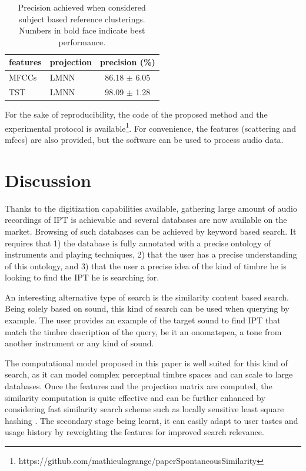 \documentclass{article}
\newcommand{\ipt}{IPT\xspace}
\begin{document}
\begin{table}
  \caption{Precision achieved when considered subject based reference clusterings. Numbers in bold face indicate best performance.}
  \label{tab:res2}
  \begin{center}
\begin{tabular}{llc}
features & projection & precision (\%) \\
  \hline
MFCCs & LMNN & 86.18 $\pm$ 6.05 \\
TST & LMNN & 98.09 $\pm$ 1.28 \\
\end{tabular}
\end{center}
\end{table}


For the sake of reproducibility, the code of the proposed method and the experimental protocol is available\footnote{https://github.com/mathieulagrange/paperSpontaneousSimilarity}. For convenience, the features (scattering and mfccs) are also provided, but the software can be used to process audio data.

\section{Discussion}\label{sec:discussion}

Thanks to the digitization capabilities available, gathering large amount of audio recordings of \ipt is achievable and several databases are now available on the market. Browsing of such databases can be achieved by keyword based search. It requires that 1) the database is fully annotated with a precise ontology of instruments and playing techniques, 2) that the user has a precise understanding of this ontology, and 3) that the user a precise idea of the kind of timbre he is looking to find the \ipt he is searching for.

An interesting alternative type of search is the similarity content based search. Being solely based on sound, this kind of search can be used when querying by example. The user provides an example of the target sound to find \ipt that match the timbre description of the query, be it an onomatepea, a tone from another instrument or any kind of sound.

The computational model proposed in this paper is well suited for this kind of search, as it can model complex perceptual timbre spaces and can scale to large databases. Once the features and the projection matrix are computed, the similarity computation is quite effective and can be further enhanced by considering fast similarity search scheme such as locally sensitive least square hashing \cite{pauleve2010locality}. The secondary stage being learnt, it can easily adapt to user tastes and usage history by reweighting the features for improved search relevance.
\end{document}

